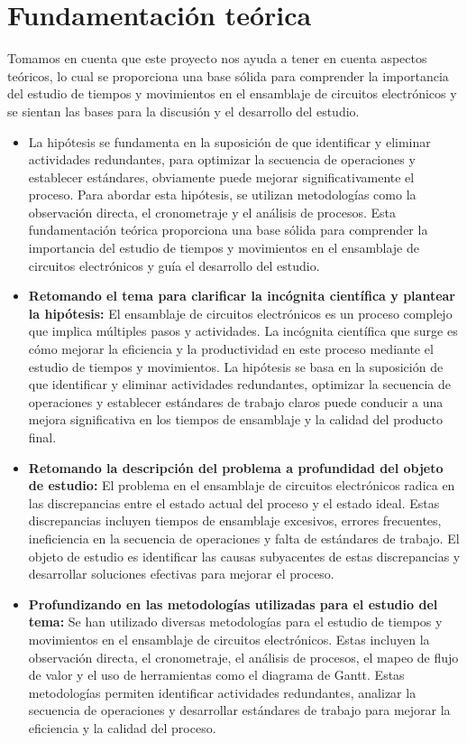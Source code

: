     \section{Fundamentación teórica}
    
    Tomamos en cuenta que este proyecto nos ayuda a tener en cuenta aspectos teóricos, lo cual se proporciona una base sólida para comprender la importancia del estudio de tiempos y movimientos en el ensamblaje de circuitos electrónicos y se sientan las bases para la discusión y el desarrollo del estudio.
    \begin{itemize}
     \item La hipótesis se fundamenta en la suposición de que identificar y eliminar actividades redundantes, para optimizar la secuencia de operaciones y establecer estándares, obviamente puede mejorar significativamente el proceso. Para abordar esta hipótesis, se utilizan metodologías como la observación directa, el cronometraje y el análisis de procesos. Esta fundamentación teórica proporciona una base sólida para comprender la importancia del estudio de tiempos y movimientos en el ensamblaje de circuitos electrónicos y guía el desarrollo del estudio.
    
    \item \textbf{Retomando el tema para clarificar la incógnita científica y plantear la hipótesis:}
    El ensamblaje de circuitos electrónicos es un proceso complejo que implica múltiples pasos y actividades. La incógnita científica que surge es cómo mejorar la eficiencia y la productividad en este proceso mediante el estudio de tiempos y movimientos. La hipótesis se basa en la suposición de que identificar y eliminar actividades redundantes, optimizar la secuencia de operaciones y establecer estándares de trabajo claros puede conducir a una mejora significativa en los tiempos de ensamblaje y la calidad del producto final.
    
    \item \textbf{Retomando la descripción del problema a profundidad del objeto de estudio:}
    El problema en el ensamblaje de circuitos electrónicos radica en las discrepancias entre el estado actual del proceso y el estado ideal. Estas discrepancias incluyen tiempos de ensamblaje excesivos, errores frecuentes, ineficiencia en la secuencia de operaciones y falta de estándares de trabajo. El objeto de estudio es identificar las causas subyacentes de estas discrepancias y desarrollar soluciones efectivas para mejorar el proceso.
    
    \item \textbf{Profundizando en las metodologías utilizadas para el estudio del tema:}
    Se han utilizado diversas metodologías para el estudio de tiempos y movimientos en el ensamblaje de circuitos electrónicos. Estas incluyen la observación directa, el cronometraje, el análisis de procesos, el mapeo de flujo de valor y el uso de herramientas como el diagrama de Gantt. Estas metodologías permiten identificar actividades redundantes, analizar la secuencia de operaciones y desarrollar estándares de trabajo para mejorar la eficiencia y la calidad del proceso.
        

\end{itemize}
